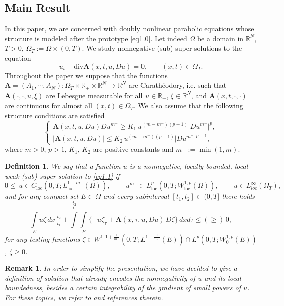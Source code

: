 \documentclass[a4paper,11pt,fullpage]{article}
\numberwithin{equation}{section}
\newtheorem{remark}{Remark}[section]
\newtheorem{definition}{Definition}[section]
\begin{document}
\noindent \subsection{Main Result}  In this paper, we are concerned with doubly nonlinear parabolic equations whose structure is modeled after the prototype \eqref{eq1.0}. Let indeed $\Omega$ be a domain in $\mathbb{R}^{N}$, $T>0$, $\Omega_{T}:= \Omega \times (0, T)$. 
We study nonnegative (sub) super-solutions to the equation
\begin{equation}\label{eq1.1}
u_{t}-\textrm{div}\mathbf{A}(x, t, u, D u)=0, \quad \quad  (x, t)\in \Omega_{T}.
\end{equation}
Throughout the paper we suppose that the functions $\mathbf{A}=(A_1, \cdots, A_N):\Omega_{T}\times \mathbb{R}_+\times \mathbb{R}^{N} \rightarrow \mathbb{R}^{N}$ are Carath\'eodory, i.e. such that
$\mathbf{A}(\cdot, \cdot, u, \xi)$ are Lebesgue measurable for all  $u\in \mathbb{R}_+$, $\xi \in \mathbb{R}^{N}$,
and $\mathbf{A}(x, t, \cdot,  \cdot)$ are continuous for almost all $(x, t)\in \Omega_{T}$.
We also assume that the following structure conditions are satisfied
\begin{equation}\label{eq1.2}
\begin{cases}
\mathbf{A}(x, t, u, D u) D u^{m^-} \geqslant  K_{1}\,u^{(m-m^-)(p-1)}|D u^{m^-}|^{p},\\
|\mathbf{A}(x, t, u,  D u)| \leqslant  K_{2}\,u^{(m-m^-)(p-1)}|D u^{m^-}|^{p-1},
\end{cases}
\end{equation}
where $m>0$, $p>1$, $K_{1}$, $K_{2}$ are positive constants and $m^-:=\min(1,m)$.

\begin{definition}
We say that a function $u$ is a  nonnegative, locally bounded, local weak  (sub) super-solution to \eqref{eq1.1} if 
\begin{equation*}
0 \leqslant \, u \in  C_{\textrm{loc}}(0, T; L^{1+m^-}_{\textrm{loc}}(\Omega)),\,\qquad u^{m^-} \in L_{\textrm{loc}}^{p}(0, T; W_{\textrm{loc}}^{1, p}(\Omega)),\,\qquad u\in L^\infty_{loc}(\Omega_T),
\end{equation*}
and for any compact set $E \subset \Omega$
and every subinterval $[t_{1}, t_{2}]\subset (0, T]$ there holds
\begin{equation}\label{eq1.3}
\int\limits_{E}u \zeta\, dx \bigg|^{t_{2}}_{t_{1}} + \int\limits^{t_{2}}\limits_{t_{1}}\int\limits_{E}
\{-u\zeta_{\tau}+ \mathbf{A}(x, \tau, u, D u) \,D \zeta\}\, dx d\tau \leqslant (\geqslant)\, 0,
\end{equation}
 for any testing functions $\zeta \in W^{1,1+\frac{1}{m^-}}(0, T; L^{1+\frac{1}{m^-}}(E))\cap L^{p}(0, T; W_{0}^{1, p}(E))$, $\zeta \geqslant 0$.
\end{definition}
\begin{remark} In order to simplify the presentation, we have decided to give a definition of solution that already encodes the nonnegativity of $u$ and its local boundedness, besides a certain integrability of the gradient of small powers of $u$. For these topics, we refer to \cite{CHSS} and references therein. 


\end{remark}
\end{document}
